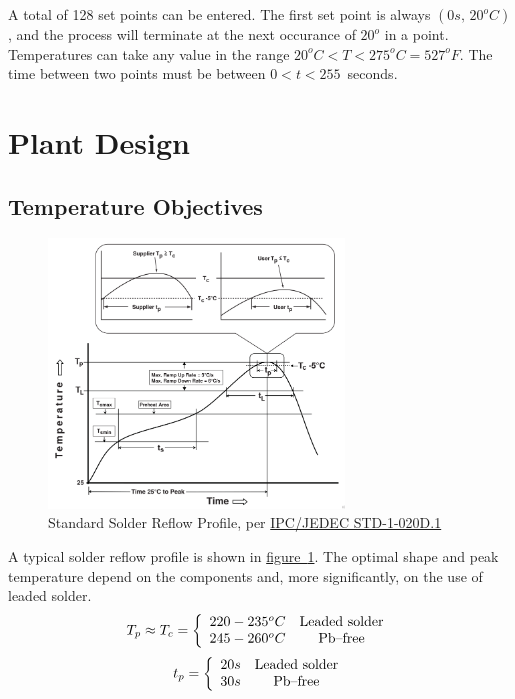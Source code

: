\documentclass[10pt, twocolumn]{article}
\begin{document}
A total of 128 set points can be entered. The first set point is always $(0s,\,20^{o}C)$,
and the process will terminate at the next occurance of $20^{o}$ in a point.
Temperatures can take any value in the range \mbox{$20^{o}C<T<275^{o}C=527^{o}F$.}
The time between two points must be between \mbox{$0<t<255$ seconds.}

\section{Plant Design}

\subsection{Temperature Objectives}

\begin{figure}
	\centering
	\includegraphics[width=0.7\textwidth]{Figures/standard-reflow-profile.pdf}
	\caption{Standard Solder Reflow Profile, per \href{J-STD-020D-1.pdf}{IPC/JEDEC STD-1-020D.1}}
	\label{standard-reflow-profile}
\end{figure}

A typical solder reflow profile is shown in
\hyperref[standard-reflow-profile]{\mbox{figure \ref{standard-reflow-profile}}}.
The optimal shape and peak temperature depend on the components and,
more significantly, on the use of leaded solder.
\begin{equation*}
T_{p}\approx T_{c}=\left\{\begin{array}{c c}
220-235^{o}C	&\textrm{Leaded solder}	\\
245-260^{o}C	&\textrm{Pb--free}	\\
\end{array}\right.
\end{equation*}
\begin{equation*}
t_{p}=\left\{\begin{array}{c c}
20s	&\textrm{Leaded solder}	\\
30s	&\textrm{Pb--free}	\\
\end{array}\right.
\end{equation*}
\end{document}
